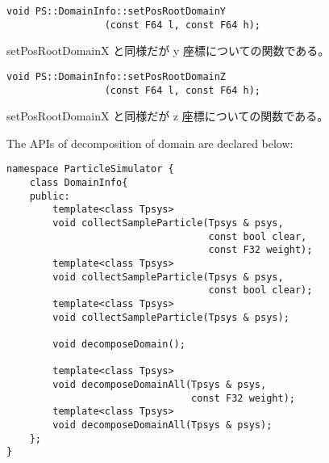 
\begin{screen}
\begin{verbatim}
void PS::DomainInfo::setPosRootDomainY
                 (const F64 l, const F64 h);
\end{verbatim}
\end{screen}

setPosRootDomainX と同様だが y 座標についての関数である。


\begin{screen}
\begin{verbatim}
void PS::DomainInfo::setPosRootDomainZ
                 (const F64 l, const F64 h);
\end{verbatim}
\end{screen}

setPosRootDomainX と同様だが z 座標についての関数である。




The APIs of decomposition of domain are declared below:

\begin{lstlisting}[caption=DomainInfo2]
namespace ParticleSimulator {
    class DomainInfo{
    public:
        template<class Tpsys>
        void collectSampleParticle(Tpsys & psys,
                                   const bool clear,
                                   const F32 weight);
        template<class Tpsys>
        void collectSampleParticle(Tpsys & psys,
                                   const bool clear);
        template<class Tpsys>
        void collectSampleParticle(Tpsys & psys);
        
        void decomposeDomain();
        
        template<class Tpsys>
        void decomposeDomainAll(Tpsys & psys,
                                const F32 weight);
        template<class Tpsys>
        void decomposeDomainAll(Tpsys & psys);
    };
}
\end{lstlisting}



